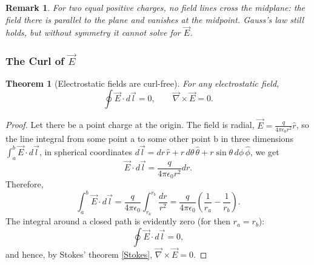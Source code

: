 \documentclass{article}
\newtheorem{theorem}{Theorem}
\newtheorem{remark}{Remark}
\begin{document}
\begin{remark}
    For two equal positive charges, no field lines cross the midplane: the field there is parallel to the plane and vanishes at the midpoint. Gauss's law still holds, but without symmetry it cannot solve for $\vec{E}$.
\end{remark}

\subsubsection{The Curl of $\vec{E}$}
\begin{theorem}[Electrostatic fields are curl-free]
    For any electrostatic field,
    \begin{equation}
        \oint\vec{E}\cdot d\vec{l} = 0, \qquad \vec{\nabla}\times\vec{E} = 0.
    \end{equation}
\end{theorem}
\begin{proof}
    Let there be a point charge at the origin. The field is radial, $\vec{E} = \frac{q}{4\pi\epsilon_0 r^2}\hat{r}$, so the line integral from some point a to some other point b in three dimensions $\int_a^b \vec{E}\cdot d\vec{l}$, in spherical coordinates $d\vec{l} = dr\,\hat{r} + r\,d\theta\,\hat{\theta} + r\sin\theta\,d\phi\,\hat{\phi}$, we get
    \[\vec{E}\cdot d\vec{l} = \frac{q}{4\pi\epsilon_0 r^2}dr.\]
    Therefore,
    \[\int_a^b \vec{E}\cdot d\vec{l} = \frac{q}{4\pi\epsilon_0}\int_{r_a}^{r_b}\frac{dr}{r^2} = \frac{q}{4\pi\epsilon_0}\left(\frac{1}{r_a} - \frac{1}{r_b}\right).\]
    The integral around a closed path is evidently zero (for then $r_a=r_b$):
    \[\oint\vec{E}\cdot d\vec{l} = 0,\]
    and hence, by Stokes' theorem \eqref{Stokes}, $\vec{\nabla}\times\vec{E} = 0$.
\end{proof}
\end{document}
